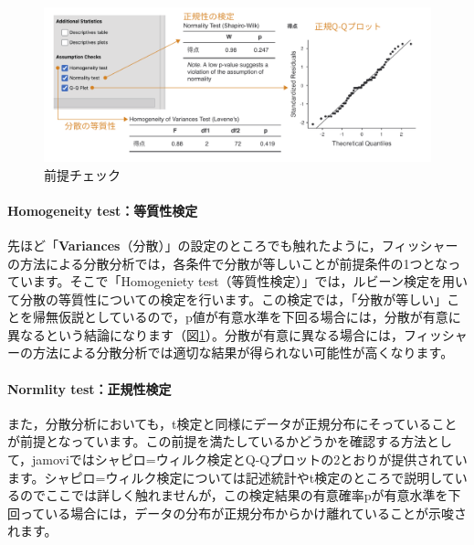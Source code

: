 \documentclass[
  12pt,
  a5jpaper,
  lualatex, ja=standard]{bxjsbook}
\begin{document}
\begin{figure}[!ht]

{\centering \includegraphics[width=1\linewidth]{images/ANOVA/oneway-assumption-checks} 

}

\caption{前提チェック}\label{fig:ANOVA-oneway-assumption-checks}
\end{figure}

\hypertarget{homogeneity-testux7b49ux8ceaux6027ux691cux5b9a-1}{%
\paragraph*{Homogeneity test：等質性検定}\label{homogeneity-testux7b49ux8ceaux6027ux691cux5b9a-1}}

先ほど「\textbf{Variances}（分散）」の設定のところでも触れたように，フィッシャーの方法による分散分析では，各条件で分散が等しいことが前提条件の1つとなっています。そこで「Homogeniety test（等質性検定）」では，ルビーン検定を用いて分散の等質性についての検定を行います。この検定では，「分散が等しい」ことを帰無仮説としているので，p値が有意水準を下回る場合には，分散が有意に異なるという結論になります（図\ref{fig:ANOVA-oneway-assumption-checks}）。分散が有意に異なる場合には，フィッシャーの方法による分散分析では適切な結果が得られない可能性が高くなります。

\hypertarget{normlity-testux6b63ux898fux6027ux691cux5b9a}{%
\paragraph*{Normlity test：正規性検定}\label{normlity-testux6b63ux898fux6027ux691cux5b9a}}

また，分散分析においても，t検定と同様にデータが正規分布にそっていることが前提となっています。この前提を満たしているかどうかを確認する方法として，jamoviではシャピロ=ウィルク検定とQ-Qプロットの2とおりが提供されています。シャピロ=ウィルク検定については記述統計やt検定のところで説明しているのでここでは詳しく触れませんが，この検定結果の有意確率pが有意水準を下回っている場合には，データの分布が正規分布からかけ離れていることが示唆されます。
\end{document}
